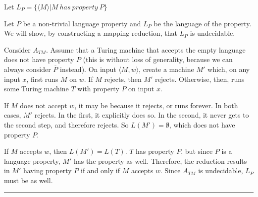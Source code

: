 \documentclass[twoside]{article}
\newenvironment{proof}{{\bf Proof:}}{\hfill\rule{2mm}{2mm}}
\begin{document}






Let $L_P = \{ \langle M \rangle | M \ has\ property \ P \}$



\begin{proof}
	
	Let $P$ be a non-trivial language property and $L_P$ be the language of the property.  We will show, by constructing a mapping reduction, that $L_P$ is undecidable.
	
	Consider $A_{TM}$.  Assume that a Turing machine that accepts the empty language does not have property $P$ (this is without loss of generality, because we can always consider $\overline{P}$ instead).  On input $\langle M,w\rangle$, create a machine $M'$ which, on any input $x$, first runs $M$ on $w$.  If $M$ rejects, then $M'$ rejects.  Otherwise, then, runs some Turing machine $T$ with property $P$ on input $x$.
	
	If $M$ does not accept $w$, it may be because it rejects, or runs forever.  In both cases, $M'$ rejects.  In the first, it explicitly does so.  In the second, it never gets to the second step, and therefore rejects.  So $L(M') = \emptyset$, which does not have property $P$.
	
	If $M$ accepts $w$, then $L(M') = L(T)$.  $T$ has property $P$, but since $P$ is a language property, $M'$ has the property as well.  Therefore, the reduction results in $M'$ having property $P$ if and only if $M$ accepts $w$.  Since $A_{TM}$ is undecidable, $L_P$ must be as well.
	
	
	
\end{proof}
\end{document}
